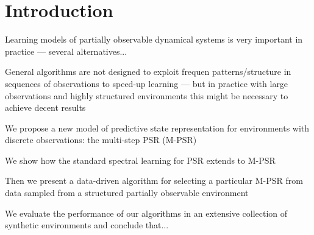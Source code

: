 \section{Introduction}

Learning models of partially observable dynamical systems is very important in practice --- several alternatives...

General algorithms are not designed to exploit frequen patterns/structure in sequences of observations to speed-up learning --- but in practice with large observations and highly structured environments this might be necessary to achieve decent results

We propose a new model of predictive state representation for environments with discrete observations: the multi-step PSR (M-PSR)

We show how the standard spectral learning for PSR extends to M-PSR

Then we present a data-driven algorithm for selecting a particular M-PSR from data sampled from a structured partially observable environment

We evaluate the performance of our algorithms in an extensive collection of synthetic environments and conclude that...
